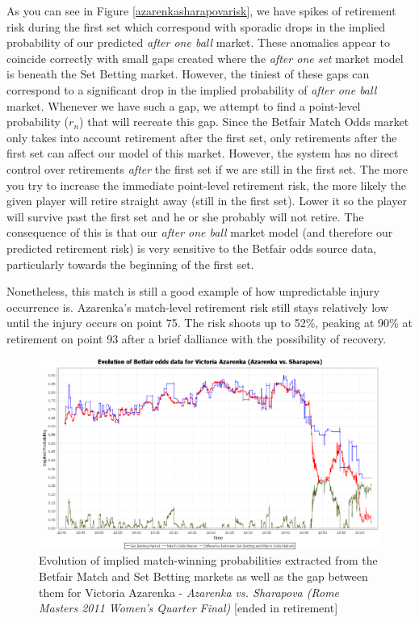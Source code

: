 \documentclass[letterpaper,12pt]{article}
\begin{document}
As you can see in Figure \ref{azarenkasharapovarisk}, we have spikes of retirement risk during the first set which correspond with sporadic drops in the implied probability of our predicted \textit{after one ball} market.  These anomalies appear to coincide correctly with small gaps created where the \textit{after one set} market model is beneath the Set Betting market.  However, the tiniest of these gaps can correspond to a significant drop in the implied probability of \textit{after one ball} market.  Whenever we have such a gap, we attempt to find a point-level probability ($r_n$) that will recreate this gap.  Since the Betfair Match Odds market only takes into account retirement after the first set, only retirements after the first set can affect our model of this market.  However, the system has no direct control over retirements \textit{after} the first set if we are still in the first set.  The more you try to increase the immediate point-level retirement risk, the more likely the given player will retire straight away (still in the first set).  Lower it so the player will survive past the first set and he or she probably will not retire.  The consequence of this is that our \textit{after one ball} market model (and therefore our predicted retirement risk) is very sensitive to the Betfair odds source data, particularly towards the beginning of the first set.

Nonetheless, this match is still a good example of how unpredictable injury occurrence is.  Azarenka's match-level retirement risk still stays relatively low until the injury occurs on point 75.  The risk shoots up to 52\%, peaking at 90\% at retirement on point 93 after a brief dalliance with the possibility of recovery.

\begin{figure}[H]
  \centering \includegraphics[width=12.3cm]{matches/azarenkasharapova}
  \caption{Evolution of implied match-winning probabilities extracted from the Betfair Match and Set Betting markets as well as the gap between them for Victoria Azarenka - \textit{Azarenka vs. Sharapova (Rome Masters 2011 Women's Quarter Final)} [ended in retirement]}
  \label{azarenkasharapova}
\end{figure}
\end{document}
